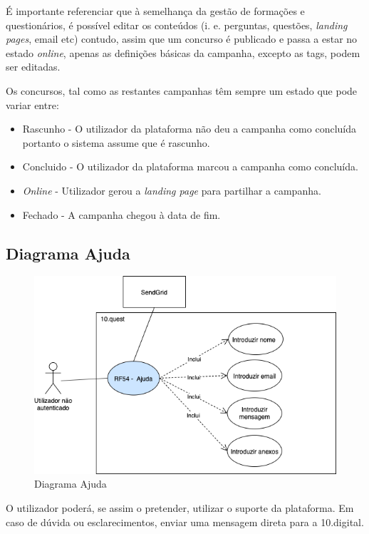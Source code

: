É importante referenciar que à semelhança da gestão de formações e questionários, é possível editar os conteúdos (i. e. perguntas, questões, \textit{landing pages}, email etc) contudo, assim que um concurso é publicado e passa a estar no estado \textit{online}, apenas as definições básicas da campanha, excepto as tags, podem ser editadas. 

Os concursos, tal como as restantes campanhas têm sempre um estado que pode variar entre:
\begin{itemize}
	\item Rascunho - O utilizador da plataforma não deu a campanha como concluída portanto o sistema assume que é rascunho.
	\item Concluido - O utilizador da plataforma marcou a campanha como concluída.
	\item \textit{Online} - Utilizador gerou a \textit{landing page} para partilhar a campanha.
	\item Fechado - A campanha chegou à data de fim.
\end{itemize}


\subsection{Diagrama Ajuda}
\label{d:ajuda}
\begin{figure}[ht!]
	\begin{center}
		\includegraphics[width=1\textwidth]{img/rf/ajuda}
		\caption{Diagrama Ajuda}
		\label{fig:rf-ajuda}
	\end{center}
\end{figure}


O utilizador poderá, se assim o pretender, utilizar o suporte da plataforma. Em caso de dúvida ou esclarecimentos, enviar uma mensagem direta para a 10.digital. 

